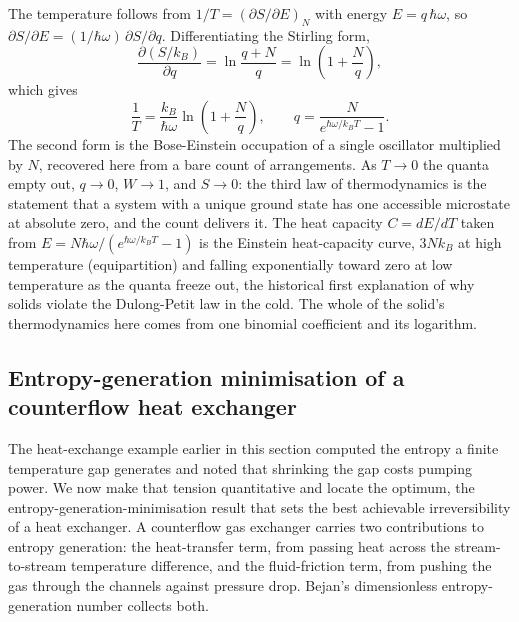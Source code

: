 The temperature follows from $1/T = (\partial S/\partial E)_{N}$ with energy
$E = q\,\hbar\omega$, so $\partial S/\partial E = (1/\hbar\omega)\,\partial
S/\partial q$. Differentiating the Stirling form,
\[
\frac{\partial (S/k_B)}{\partial q} = \ln\frac{q+N}{q}
= \ln\left(1 + \frac{N}{q}\right),
\]
which gives
\[
\frac{1}{T} = \frac{k_B}{\hbar\omega}\ln\left(1 + \frac{N}{q}\right),
\qquad
q = \frac{N}{e^{\hbar\omega/k_B T} - 1}.
\]
The second form is the Bose-Einstein occupation of a single oscillator
multiplied by $N$, recovered here from a bare count of arrangements. As $T \to
0$ the quanta empty out, $q \to 0$, $W \to 1$, and $S \to 0$: the third law of
thermodynamics is the statement that a system with a unique ground state has one
accessible microstate at absolute zero, and the count delivers it. The
heat capacity $C = dE/dT$ taken from $E = N\hbar\omega/(e^{\hbar\omega/k_B T}-1)$
is the Einstein heat-capacity curve, $3Nk_B$ at high temperature (equipartition)
and falling exponentially toward zero at low temperature as the quanta freeze
out, the historical first explanation of why solids violate the
Dulong-Petit law in the cold. The whole of the solid's thermodynamics here comes
from one binomial coefficient and its logarithm.

\subsection{Entropy-generation minimisation of a counterflow heat exchanger}

The heat-exchange example earlier in this section computed the entropy a finite
temperature gap generates and noted that shrinking the gap costs pumping power.
We now make that tension quantitative and locate the optimum, the
entropy-generation-minimisation result that sets the best achievable
irreversibility of a heat exchanger. A counterflow gas exchanger carries two
contributions to entropy generation: the heat-transfer term, from passing heat
across the stream-to-stream temperature difference, and the fluid-friction term,
from pushing the gas through the channels against pressure drop. Bejan's
dimensionless entropy-generation number collects both.

